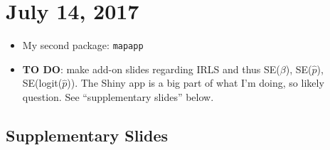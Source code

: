 \documentclass{article}
\begin{document}
\section*{July 14, 2017}
\begin{itemize}
\item My second package: \verb|mapapp|
\item {\bf TO DO}: make add-on slides regarding IRLS and thus SE($\beta$), SE($\hat{p}$), SE(logit($\hat{p}$)). The Shiny app is a big part of what I'm doing, so likely question. See ``supplementary slides'' below.
\end{itemize}

\subsection*{Supplementary Slides}
\end{document}
